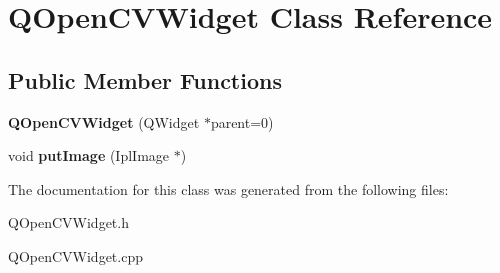 \hypertarget{classQOpenCVWidget}{
\section{QOpenCVWidget Class Reference}
\label{classQOpenCVWidget}
}
\subsection*{Public Member Functions}
\begin{DoxyCompactItemize}
\item 
\hypertarget{classQOpenCVWidget_abf749cf9489d7d186a5bed5dccc04f29}{
{\bfseries QOpenCVWidget} (QWidget $\ast$parent=0)}
\label{classQOpenCVWidget_abf749cf9489d7d186a5bed5dccc04f29}

\item 
\hypertarget{classQOpenCVWidget_aa102dac111bb7dda8e9740257c9b629d}{
void {\bfseries putImage} (IplImage $\ast$)}
\label{classQOpenCVWidget_aa102dac111bb7dda8e9740257c9b629d}

\end{DoxyCompactItemize}


The documentation for this class was generated from the following files:\begin{DoxyCompactItemize}
\item 
QOpenCVWidget.h\item 
QOpenCVWidget.cpp\end{DoxyCompactItemize}

